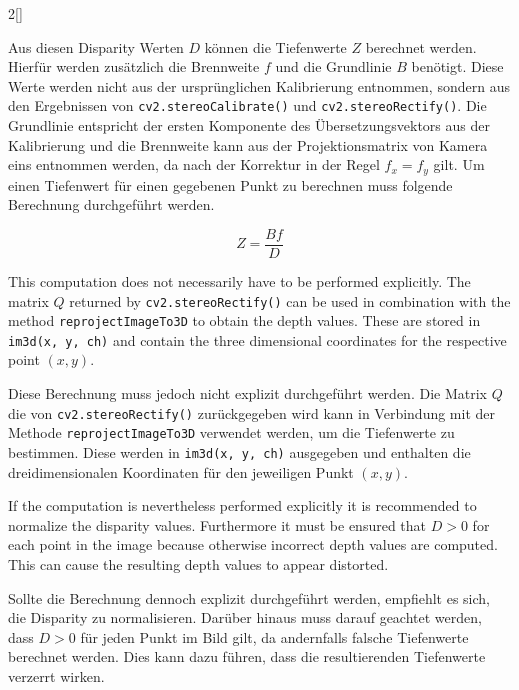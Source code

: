 \begin{paracol}{2}[]
\colger

Aus diesen Disparity Werten $D$ können die Tiefenwerte $Z$ berechnet werden. Hierfür werden zusätzlich die Brennweite $f$ und die Grundlinie $B$ benötigt. Diese Werte werden nicht aus der ursprünglichen Kalibrierung entnommen, sondern aus den Ergebnissen von \texttt{cv2.stereoCalibrate()} und \texttt{cv2.stereoRectify()}. Die Grundlinie entspricht der ersten Komponente des Übersetzungsvektors aus der Kalibrierung und die Brennweite kann aus der Projektionsmatrix von Kamera eins entnommen werden, da nach der Korrektur in der Regel $f_x = f_y$ gilt. Um einen Tiefenwert für einen gegebenen Punkt zu berechnen muss folgende Berechnung durchgeführt werden.

\colende

$$ Z = \frac{Bf}{D} $$

\colstart

This computation does not necessarily have to be performed explicitly. The matrix $Q$ returned by \texttt{cv2.stereoRectify()} can be used in combination with the method \texttt{reprojectImageTo3D} to obtain the depth values. These are stored in \texttt{im3d(x, y, ch)} and contain the three dimensional coordinates for the respective point $(x, y)$.

\colger

Diese Berechnung muss jedoch nicht explizit durchgeführt werden. Die Matrix $Q$ die von \texttt{cv2.stereoRectify()} zurückgegeben wird kann in Verbindung mit der Methode \texttt{reprojectImageTo3D} verwendet werden, um die Tiefenwerte zu bestimmen. Diese werden in \texttt{im3d(x, y, ch)} ausgegeben und enthalten die dreidimensionalen Koordinaten für den jeweiligen Punkt $(x, y)$.

\coleng

If the computation is nevertheless performed explicitly it is recommended to normalize the disparity values. Furthermore it must be ensured that $D > 0$ for each point in the image because otherwise incorrect depth values are computed. This can cause the resulting depth values to appear distorted.

\colger

Sollte die Berechnung dennoch explizit durchgeführt werden, empfiehlt es sich, die Disparity zu normalisieren. Darüber hinaus muss darauf geachtet werden, dass $D > 0$ für jeden Punkt im Bild gilt, da andernfalls falsche Tiefenwerte berechnet werden. Dies kann dazu führen, dass die resultierenden Tiefenwerte verzerrt wirken.

\coleng


\end{paracol}
